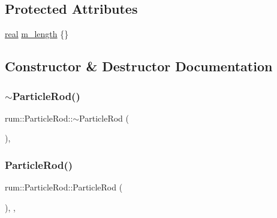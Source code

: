 \subsection*{Protected Attributes}
\begin{DoxyCompactItemize}
\item 
\mbox{\hyperlink{namespacerum_a7e8cca23573d5eaead0f138cbaa4862c}{real}} \mbox{\hyperlink{classrum_1_1_particle_rod_a9f5c266ef3a91afc3f3c41b7c0f300a9}{m\+\_\+length}} \{\}
\end{DoxyCompactItemize}


\subsection{Constructor \& Destructor Documentation}
\mbox{\label{classrum_1_1_particle_rod_a59886e0bd126236a5f4cf1098ac39122}} 
\subsubsection{\texorpdfstring{$\sim$\+Particle\+Rod()}{~ParticleRod()}}
{\footnotesize\ttfamily rum\+::\+Particle\+Rod\+::$\sim$\+Particle\+Rod (\begin{DoxyParamCaption}{ }\end{DoxyParamCaption})\hspace{0.3cm}{\ttfamily [virtual]}, {\ttfamily [default]}}

\mbox{\label{classrum_1_1_particle_rod_a76dc622d8d214830fc8b270e7cc21efc}} 
\subsubsection{\texorpdfstring{Particle\+Rod()}{ParticleRod()}}
{\footnotesize\ttfamily rum\+::\+Particle\+Rod\+::\+Particle\+Rod (\begin{DoxyParamCaption}{ }\end{DoxyParamCaption})\hspace{0.3cm}{\ttfamily [explicit]}, {\ttfamily [protected]}, {\ttfamily [default]}}




